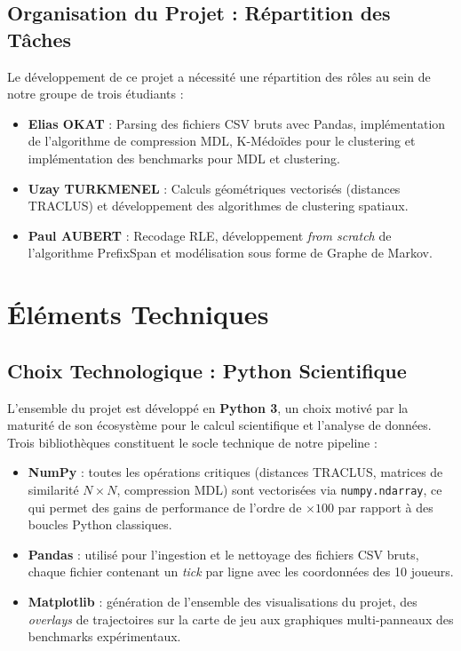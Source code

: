 \documentclass[11pt, a4paper]{article}
\begin{document}
\subsection{Organisation du Projet : Répartition des Tâches}
Le développement de ce projet a nécessité une répartition des rôles au sein de notre groupe de trois étudiants :
\begin{itemize}
    \item \textbf{Elias OKAT} : Parsing des fichiers CSV bruts avec Pandas, implémentation de l'algorithme de compression MDL, K-Médoïdes pour le clustering et implémentation des benchmarks pour MDL et clustering.
    \item \textbf{Uzay TURKMENEL} : Calculs géométriques vectorisés (distances TRACLUS) et développement des algorithmes de clustering spatiaux.
    \item \textbf{Paul AUBERT} : Recodage RLE, développement \textit{from scratch} de l'algorithme PrefixSpan et modélisation sous forme de Graphe de Markov.
\end{itemize}

\section{Éléments Techniques}

\subsection{Choix Technologique : Python Scientifique}

L'ensemble du projet est développé en \textbf{Python 3}, un choix motivé par la maturité de son écosystème pour le calcul scientifique et l'analyse de données. Trois bibliothèques constituent le socle technique de notre pipeline :

\begin{itemize}
    \item \textbf{NumPy} : toutes les opérations critiques (distances TRACLUS, matrices de similarité $N \times N$, compression MDL) sont vectorisées via \texttt{numpy.ndarray}, ce qui permet des gains de performance de l'ordre de $\times 100$ par rapport à des boucles Python classiques.
    \item \textbf{Pandas} : utilisé pour l'ingestion et le nettoyage des fichiers CSV bruts, chaque fichier contenant un \textit{tick} par ligne avec les coordonnées des 10 joueurs.
    \item \textbf{Matplotlib} : génération de l'ensemble des visualisations du projet, des \textit{overlays} de trajectoires sur la carte de jeu aux graphiques multi-panneaux des benchmarks expérimentaux.
\end{itemize}
\end{document}
